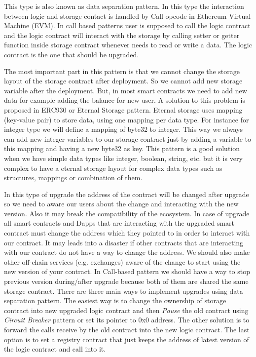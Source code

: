 

This type is also known as data separation pattern. In this type the interaction between logic and storage contact is handled by Call opcode in Ethereum Virtual Machine (EVM). In call based patterns user is supposed to call the logic contract and the logic contract will interact with the storage by calling setter or getter function inside storage contract whenever needs to read or write a data. The logic contract is the one that should be upgraded.

The most important part in this pattern is that we cannot change the storage layout of the storage contract after deployment. So we cannot add new storage variable after the deployment. But, in most smart contracts we need to add new data for example adding the balance for new user. A solution to this problem is proposed in ERC930 or Eternal Storage pattern. Eternal storage uses mapping (key-value pair) to store data, using one mapping per data type. For instance for integer type we will define a mapping of byte32 to integer. This way we always can add new integer variables to our storage contract just by adding a variable to this mapping and having a new byte32 as key. This pattern is a good solution when we have simple data types like integer, boolean, string, etc. but it is very complex to have a eternal storage layout for complex data types such as structures, mappings or combination of them.

In this type of upgrade the address of the contract will be changed after upgrade so we need to aware our users about the change and interacting with the new version. Also it may break the compatibility of the ecosystem. In case of upgrade all smart contracts and Dapps that are interacting with the upgraded smart contract must change the address which they pointed to in order to interact with our contract. It may leads into a disaster if other contracts that are interacting with our contract do not have a way to change the address. We should also make other off-chain services (e.g. exchanges) aware of the change to start using the new version of your contract. In Call-based pattern we should have a way to stop previous version during/after upgrade because both of them are shared the same storage contract. 
There are three main ways to implement upgrades using data separation pattern. The easiest way is to change the ownership of storage contract into new upgraded logic contract and then \textit{Pause} the old contract using \textit{Circuit Breaker} pattern or set its pointer to 0x0 address. The other solution is to forward the calls receive by the old contract into the new logic contract. The last option is to set a registry contract that just keeps the address of latest version of the logic contract and call into it.


